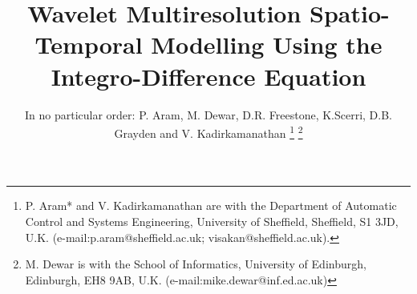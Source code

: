 \documentclass[journal,a4paper]{IEEEtran}
\begin{document}
%
\title{Wavelet Multiresolution Spatio-Temporal Modelling Using the Integro-Difference Equation }
%
%
%

\author{In no particular order: P. Aram, M. Dewar, D.R. Freestone, K.Scerri, D.B. Grayden and V. Kadirkamanathan %
\thanks{P. Aram* and V. Kadirkamanathan are with the Department of Automatic Control and Systems Engineering, University of Sheffield, Sheffield, S1 3JD, U.K. (e-mail:p.aram@sheffield.ac.uk; visakan@sheffield.ac.uk).}%
\thanks{M. Dewar is with the School of Informatics, University of Edinburgh, Edinburgh, EH8 9AB, U.K. (e-mail:mike.dewar@inf.ed.ac.uk)}}%

% 
%



% 
 \ifCLASSOPTIONpeerreview
\else
\fi
\end{document}
